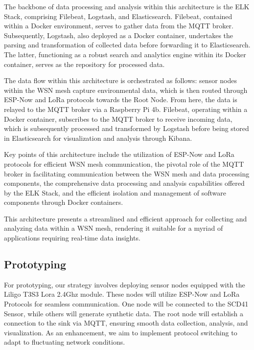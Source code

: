 The backbone of data processing and analysis within this architecture is the ELK Stack, comprising Filebeat, Logstash, and Elasticsearch. Filebeat, contained within a Docker environment, serves to gather data from the MQTT broker. Subsequently, Logstash, also deployed as a Docker container, undertakes the parsing and transformation of collected data before forwarding it to Elasticsearch. The latter, functioning as a robust search and analytics engine within its Docker container, serves as the repository for processed data.

The data flow within this architecture is orchestrated as follows: sensor nodes within the WSN mesh capture environmental data, which is then routed through ESP-Now and LoRa protocols towards the Root Node. From here, the data is relayed to the MQTT broker via a Raspberry Pi 4b. Filebeat, operating within a Docker container, subscribes to the MQTT broker to receive incoming data, which is subsequently processed and transformed by Logstash before being stored in Elasticsearch for visualization and analysis through Kibana.

Key points of this architecture include the utilization of ESP-Now and LoRa protocols for efficient WSN mesh communication, the pivotal role of the MQTT broker in facilitating communication between the WSN mesh and data processing components, the comprehensive data processing and analysis capabilities offered by the ELK Stack, and the efficient isolation and management of software components through Docker containers.

This architecture presents a streamlined and efficient approach for collecting and analyzing data within a WSN mesh, rendering it suitable for a myriad of applications requiring real-time data insights.


\subsection{Prototyping}\label{prototyping}
For prototyping, our strategy involves deploying sensor nodes equipped with the Liligo T3S3 Lora 2.4Ghz module. These nodes will utilize ESP-Now and LoRa Protocols for seamless communication. One node will be connected to the SCD41 Sensor, while others will generate synthetic data. The root node will establish a connection to the sink via MQTT, ensuring smooth data collection, analysis, and visualization. As an enhancement, we aim to implement protocol switching to adapt to fluctuating network conditions.

